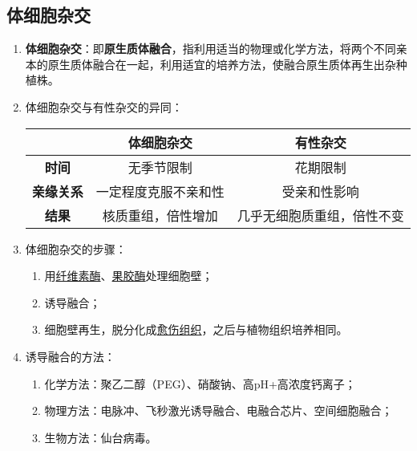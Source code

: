 \subsection{体细胞杂交}
\begin{enumerate}
    \item \textbf{体细胞杂交}：即\textbf{原生质体融合}，指利用适当的物理或化学方法，将两个不同亲本的原生质体融合在一起，利用适宜的培养方法，使融合原生质体再生出杂种植株。
    \item 体细胞杂交与有性杂交的异同：
    \begin{table}[h]
        \centering
        \begin{tabular}{ccc}
            \toprule
            &\textbf{体细胞杂交}&\textbf{有性杂交}\\
            \midrule
            \textbf{时间}&无季节限制&花期限制\\
            \textbf{亲缘关系}&一定程度克服不亲和性&受亲和性影响\\
            \textbf{结果}&核质重组，倍性增加&几乎无细胞质重组，倍性不变\\
            \bottomrule                        
        \end{tabular}
    \end{table}
    \item 体细胞杂交的步骤：
    \begin{enumerate}
        \item 用\uline{纤维素酶}、\uline{果胶酶}处理细胞壁；
        \item 诱导融合；
        \item 细胞壁再生，脱分化成\uline{愈伤组织}，之后与植物组织培养相同。
    \end{enumerate}
    \item 诱导融合的方法：
    \begin{enumerate}
        \item 化学方法：聚乙二醇（PEG）、硝酸钠、高pH+高浓度钙离子；
        \item 物理方法：电脉冲、飞秒激光诱导融合、电融合芯片、空间细胞融合；
        \item 生物方法：仙台病毒。
    \end{enumerate}
\end{enumerate}
